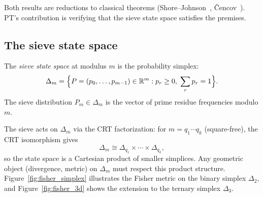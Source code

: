 \documentclass[12pt,a4paper]{article}
\begin{document}
Both results are reductions to classical theorems (Shore--Johnson~\cite{ShoreJohnson1980},
\v{C}encov~\cite{Cencov1982}). PT's contribution is verifying that the sieve state
space satisfies the premises.

\subsection{The sieve state space}
\label{sec:ch5_state_space}

\begin{definition}
\label{def:simplex}
The \emph{sieve state space} at modulus $m$ is the probability simplex:
\[
  \Delta_m = \Bigl\{ P = (p_0, \ldots, p_{m-1}) \in \mathbb{R}^m
             : p_r \geq 0,\; \sum_r p_r = 1 \Bigr\}.
\]
The sieve distribution $P_m \in \Delta_m$ is the vector of prime
residue frequencies modulo $m$.
\end{definition}

The sieve acts on $\Delta_m$ via the CRT factorization:
for $m = q_1 \cdots q_k$ (square-free), the CRT isomorphism gives
\[
  \Delta_m \cong \Delta_{q_1} \times \cdots \times \Delta_{q_k},
\]
so the state space is a Cartesian product of smaller simplices.
Any geometric object (divergence, metric) on $\Delta_m$ must respect
this product structure.
Figure~\ref{fig:fisher_simplex} illustrates the Fisher metric on the
binary simplex $\Delta_2$, and Figure~\ref{fig:fisher_3d} shows the
extension to the ternary simplex $\Delta_3$.
\end{document}
